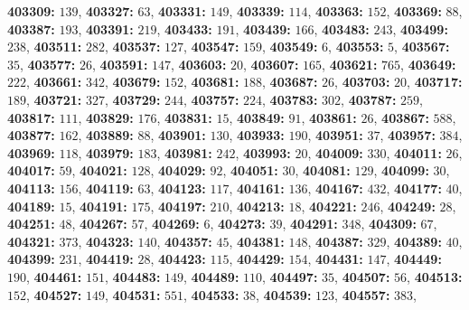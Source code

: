 \textsf{\bfseries 403309:} $139$, \textsf{\bfseries 403327:} $63$, \textsf{\bfseries 403331:} $149$, \textsf{\bfseries 403339:} $114$, \textsf{\bfseries 403363:} $152$, \textsf{\bfseries 403369:} $88$, \textsf{\bfseries 403387:} $193$, \textsf{\bfseries 403391:} $219$, \textsf{\bfseries 403433:} $191$, \textsf{\bfseries 403439:} $166$, \textsf{\bfseries 403483:} $243$, \textsf{\bfseries 403499:} $238$, \textsf{\bfseries 403511:} $282$, \textsf{\bfseries 403537:} $127$, \textsf{\bfseries 403547:} $159$, \textsf{\bfseries 403549:} $6$, \textsf{\bfseries 403553:} $5$, \textsf{\bfseries 403567:} $35$, \textsf{\bfseries 403577:} $26$, \textsf{\bfseries 403591:} $147$, \textsf{\bfseries 403603:} $20$, \textsf{\bfseries 403607:} $165$, \textsf{\bfseries 403621:} $765$, \textsf{\bfseries 403649:} $222$, \textsf{\bfseries 403661:} $342$, \textsf{\bfseries 403679:} $152$, \textsf{\bfseries 403681:} $188$, \textsf{\bfseries 403687:} $26$, \textsf{\bfseries 403703:} $20$, \textsf{\bfseries 403717:} $189$, \textsf{\bfseries 403721:} $327$, \textsf{\bfseries 403729:} $244$, \textsf{\bfseries 403757:} $224$, \textsf{\bfseries 403783:} $302$, \textsf{\bfseries 403787:} $259$, \textsf{\bfseries 403817:} $111$, \textsf{\bfseries 403829:} $176$, \textsf{\bfseries 403831:} $15$, \textsf{\bfseries 403849:} $91$, \textsf{\bfseries 403861:} $26$, \textsf{\bfseries 403867:} $588$, \textsf{\bfseries 403877:} $162$, \textsf{\bfseries 403889:} $88$, \textsf{\bfseries 403901:} $130$, \textsf{\bfseries 403933:} $190$, \textsf{\bfseries 403951:} $37$, \textsf{\bfseries 403957:} $384$, \textsf{\bfseries 403969:} $118$, \textsf{\bfseries 403979:} $183$, \textsf{\bfseries 403981:} $242$, \textsf{\bfseries 403993:} $20$, \textsf{\bfseries 404009:} $330$, \textsf{\bfseries 404011:} $26$, \textsf{\bfseries 404017:} $59$, \textsf{\bfseries 404021:} $128$, \textsf{\bfseries 404029:} $92$, \textsf{\bfseries 404051:} $30$, \textsf{\bfseries 404081:} $129$, \textsf{\bfseries 404099:} $30$, \textsf{\bfseries 404113:} $156$, \textsf{\bfseries 404119:} $63$, \textsf{\bfseries 404123:} $117$, \textsf{\bfseries 404161:} $136$, \textsf{\bfseries 404167:} $432$, \textsf{\bfseries 404177:} $40$, \textsf{\bfseries 404189:} $15$, \textsf{\bfseries 404191:} $175$, \textsf{\bfseries 404197:} $210$, \textsf{\bfseries 404213:} $18$, \textsf{\bfseries 404221:} $246$, \textsf{\bfseries 404249:} $28$, \textsf{\bfseries 404251:} $48$, \textsf{\bfseries 404267:} $57$, \textsf{\bfseries 404269:} $6$, \textsf{\bfseries 404273:} $39$, \textsf{\bfseries 404291:} $348$, \textsf{\bfseries 404309:} $67$, \textsf{\bfseries 404321:} $373$, \textsf{\bfseries 404323:} $140$, \textsf{\bfseries 404357:} $45$, \textsf{\bfseries 404381:} $148$, \textsf{\bfseries 404387:} $329$, \textsf{\bfseries 404389:} $40$, \textsf{\bfseries 404399:} $231$, \textsf{\bfseries 404419:} $28$, \textsf{\bfseries 404423:} $115$, \textsf{\bfseries 404429:} $154$, \textsf{\bfseries 404431:} $147$, \textsf{\bfseries 404449:} $190$, \textsf{\bfseries 404461:} $151$, \textsf{\bfseries 404483:} $149$, \textsf{\bfseries 404489:} $110$, \textsf{\bfseries 404497:} $35$, \textsf{\bfseries 404507:} $56$, \textsf{\bfseries 404513:} $152$, \textsf{\bfseries 404527:} $149$, \textsf{\bfseries 404531:} $551$, \textsf{\bfseries 404533:} $38$, \textsf{\bfseries 404539:} $123$, \textsf{\bfseries 404557:} $383$, 
